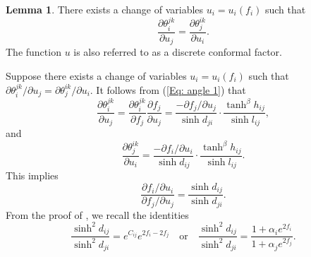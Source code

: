 \documentclass[12pt]{amsart}
\theoremstyle{definition}
\newtheorem{lemma}[theorem]{Lemma}
\begin{document}
\begin{lemma}\label{Lem: angle variations 3}
There exists a change of variables $u_i=u_i(f_i)$ such that
\begin{equation*}
\frac{\partial \theta^{jk}_i}{\partial u_j}
=\frac{\partial \theta^{ik}_j}{\partial u_i}.
\end{equation*}
The function $u$ is also referred to as a discrete conformal factor.
\end{lemma}
\proof
Suppose there exists a change of variables $u_i=u_i(f_i)$ such that $\partial \theta^{jk}_i/\partial u_j=\partial \theta^{ik}_j/\partial u_i$.
It follows from (\ref{Eq: angle 1}) that
\begin{equation*}
\frac{\partial \theta^{jk}_i}{\partial u_j}
=\frac{\partial \theta^{jk}_i}{\partial f_j}\frac{\partial f_j}{\partial u_j}
=\frac{-\partial f_j/\partial u_j}{\sinh d_{ji}}\cdot\frac{\tanh^\beta h_{ij}}{\sinh l_{ij}},
\end{equation*}
and
\begin{equation*}
\frac{\partial \theta^{ik}_j}{\partial u_i}
=\frac{-\partial f_i/\partial u_i}{\sinh d_{ij}}\cdot\frac{\tanh^\beta h_{ij}}{\sinh l_{ij}}.
\end{equation*}
This implies
\begin{equation*}
\frac{\partial f_i/\partial u_i}{\partial f_j/\partial u_j}=\frac{\sinh d_{ij}}{\sinh d_{ji}}.
\end{equation*}
From the proof of \cite[Theorem \ref{Thm: DCS}]{X-Z DCS1}, we recall the identities
\begin{equation*}
\frac{\sinh^2 d_{ij}}{\sinh^2 d_{ji}}=e^{C_{ij}}e^{2f_i-2f_j}  \quad \text{or} \quad
\frac{\sinh^2 d_{ij}}{\sinh^2 d_{ji}}
=\frac{1+\alpha_{i}e^{2f_i}}{1+\alpha_{j}e^{2f_j}}.
\end{equation*}
\end{document}
